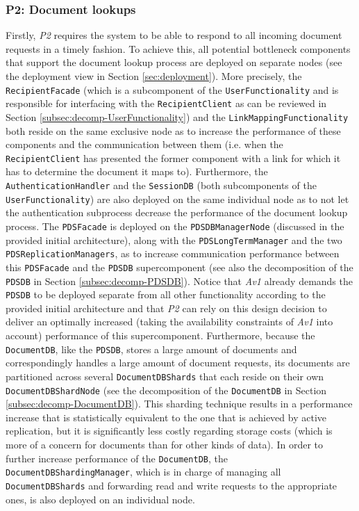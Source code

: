 \documentclass[a4paper,10pt]{article}
\begin{document}
\subsubsection{P2: Document lookups}\label{subsubsec:P2}
Firstly, \textit{P2} requires the system to be able to respond to all incoming document requests in a timely fashion. To achieve this, all potential bottleneck components that support the document lookup process are deployed on separate nodes (see the deployment view in Section \ref{sec:deployment}). More precisely, the \texttt{RecipientFacade} (which is a subcomponent of the \texttt{UserFunctionality} and is responsible for interfacing with the \texttt{RecipientClient} as can be reviewed in Section \ref{subsec:decomp-UserFunctionality}) and the \texttt{LinkMappingFunctionality} both reside on the same exclusive node as to increase the performance of these components and the communication between them (i.e. when the \texttt{RecipientClient} has presented the former component with a link for which it has to determine the document it maps to). Furthermore, the \texttt{AuthenticationHandler} and the \texttt{SessionDB} (both subcomponents of the \texttt{UserFunctionality}) are also deployed on the same individual node as to not let the authentication subprocess decrease the performance of the document lookup process. The \texttt{PDSFacade} is deployed on the \texttt{PDSDBManagerNode} (discussed in the provided initial architecture), along with the \texttt{PDSLongTermManager} and the two \texttt{PDSReplicationManagers}, as to increase communication performance between this \texttt{PDSFacade} and the \texttt{PDSDB} supercomponent (see also the decomposition of the \texttt{PDSDB} in Section \ref{subsec:decomp-PDSDB}). Notice that \textit{Av1} already demands the \texttt{PDSDB} to be deployed separate from all other functionality according to the provided initial architecture and that \textit{P2} can rely on this design decision to deliver an optimally increased (taking the availability constraints of \textit{Av1} into account) performance of this supercomponent. Furthermore, because the \texttt{DocumentDB}, like the \texttt{PDSDB}, stores a large amount of documents and correspondingly handles a large amount of document requests, its documents are partitioned across several \texttt{DocumentDBShards} that each reside on their own \texttt{DocumentDBShardNode} (see the decomposition of the \texttt{DocumentDB} in Section \ref{subsec:decomp-DocumentDB}). This sharding technique results in a performance increase that is statistically equivalent to the one that is achieved by active replication, but it is significantly less costly regarding storage costs (which is more of a concern for documents than for other kinds of data). In order to further increase performance of the \texttt{DocumentDB}, the \texttt{DocumentDBShardingManager}, which is in charge of managing all \texttt{DocumentDBShards} and forwarding read and write requests to the appropriate ones, is also deployed on an individual node.\\\\
\end{document}
